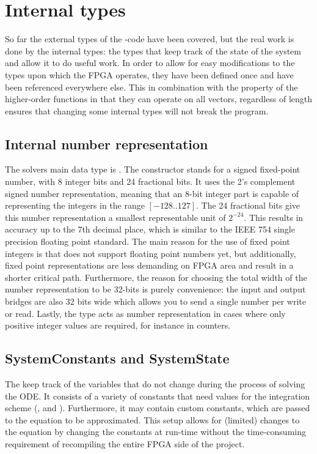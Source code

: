 \section{Internal types}
So far the external types of the \clash{}-code have been covered, but the real work is done by the internal types: the types that keep track of the state of the system and allow it to do useful work. In order to allow for easy modifications to the types upon which the FPGA operates, they have been defined once and have been referenced everywhere else. This in combination with the property of the higher-order functions in \clash{} that they can operate on all vectors, regardless of length ensures that changing some internal types will not break the program.

\subsection{Internal number representation}
The solvers main data type is . The constructor  stands for a signed fixed-point number, with 8 integer bits and 24 fractional bits. It uses the 2's complement signed number representation, meaning that an 8-bit integer part is capable of representing the integers in the range $[-128..127]$. The 24 fractional bits give this number representation a smallest representable unit of $2^{-24}$. This results in accuracy up to the 7th decimal place, which is similar to the IEEE 754 single precision floating point standard. The main reason for the use of fixed point integers is that \clash{} does not support floating point numbers yet, but additionally, fixed point representations are less demanding on FPGA area and result in a shorter critical path. Furthermore, the reason for choosing the total width of the number representation to be 32-bits is purely convenience: the input and output bridges are also 32 bits wide which allows you to send a single number per write or read. Lastly, the  type acts as number representation in cases where only positive integer values are required, for instance in counters.

\subsection{SystemConstants and SystemState}
The  keep track of the variables that do not change during the process of solving the ODE. It consists of a variety of constants that need values for the integration scheme (,  and ). Furthermore, it may contain custom constants, which are passed to the equation to be approximated. This setup allows for (limited) changes to the equation by changing the constants at run-time without the time-consuming requirement of recompiling the entire FPGA side of the project.

